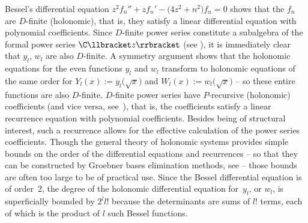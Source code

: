 \documentclass[pdftex]{sigma}
\numberwithin{equation}{section}
\theoremstyle{definition}
\begin{document}
Bessel's differential equation
$
z^2 f_n'' + z f_n' - \bigl(4z^2 + n^2\bigr)f_n=0
$
shows that the $f_n$ are $D$-finite (holonomic), that is, they satisfy a linear differential equation with polynomial coefficients. Since $D$-finite power series constitute a subalgebra of the formal power series $\C\llbracket z\rrbracket$ (see \cite[Theorem~2.3]{St80}), it is immediately clear that $y_l$, $w_l$ are also $D$-finite. A symmetry argument shows that the holonomic equations for the even functions $y_l$ and $w_l$ transform to holonomic equations of the same order for $Y_l(x):=y_l\bigl(\sqrt{x}\bigr)$ and $W_l(x):=w_l\bigl(\sqrt{x}\bigr)$ -- so these entire functions are also $D$-finite.
$D$-finite power series have $P$-recursive (holonomic) coefficients (and vice versa, see~\cite[Theorem~1.5]{St80}), that is, the coefficients satisfy a linear recurrence equation with polynomial coefficients. Besides being of structural interest, such a recurrence allows for the effective calculation of the power series coefficients.
Though the general theory of holonomic systems provides simple bounds on the order of the differential equations and recurrences -- so that they can be constructed by Groebner bases elimination methods, see \cite[Section 4]{Z} -- those bounds are often too large to be of practical use. Since the Bessel differential equation is of order~$2$, the degree of the holonomic differential equation for~$y_l$, or $w_l$, is superficially bounded by $2^l l!$ because the determinants are
 sums of $l!$ terms, each of which is the product of $l$ such Bessel functions.
\end{document}
